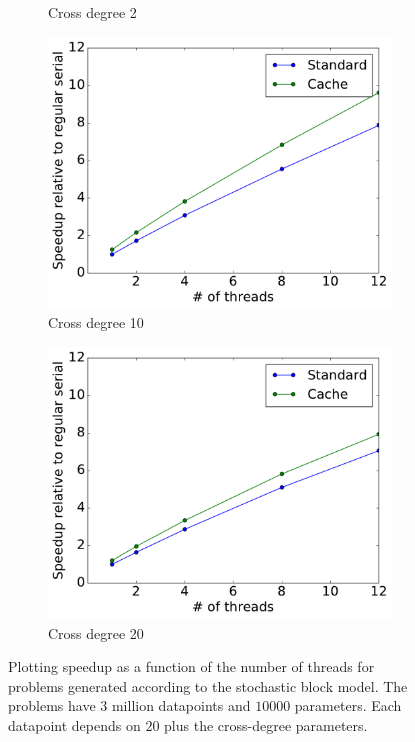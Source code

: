 \documentclass[times,11pt]{article}
\numberwithin{equation}{section}		%
\numberwithin{figure}{section}			%
\numberwithin{table}{section}				%
\begin{document}
\begin{figure}[h!]
\begin{subfigure}[b]{0.49\columnwidth}
      \caption{\scriptsize Cross degree 2}
      \label{fig:pcross0.1}
    \end{subfigure}
 \begin{subfigure}[b]{0.49\columnwidth}
	\centerline{\includegraphics[width = 0.85\columnwidth, trim={0 0.1cm  0 0}, clip]{report_LS_speedup_blockmodel_pcross=05.pdf}}
      \caption{\scriptsize Cross degree 10}
      \label{fig:pcross0.5}
    \end{subfigure}
   \begin{subfigure}[b]{0.49\columnwidth}
      	\centerline{\includegraphics[width = 0.85\columnwidth, trim={0 0.1cm  0 0}, clip]{report_LS_speedup_blockmodel_pcross=1.pdf}}
      \caption{\scriptsize Cross degree 20}
      \label{fig:pcross1}
    \end{subfigure}
  \caption{Plotting speedup as a function of the number of threads for problems generated according to the stochastic block model. The problems have $3$ million datapoints and $10000$ parameters. Each datapoint depends on $20$ plus the cross-degree parameters.}
  \label{fig:unif-pref}
\end{figure}
\end{document}
